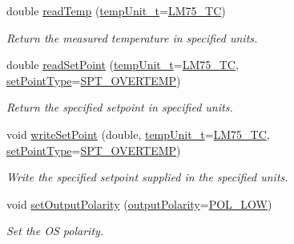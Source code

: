 \begin{DoxyCompactItemize}
\item 
double \hyperlink{class_l_m75_ae400ef90dd61fe676d10665a53e1e251}{read\-Temp} (\hyperlink{class_l_m75_a2a7ea6f324fe6d70e90dd76bac1d2f2d}{temp\-Unit\-\_\-t}=\hyperlink{class_l_m75_a2a7ea6f324fe6d70e90dd76bac1d2f2dac93d25e3d1bca073b3fb6c725de49ea1}{L\-M75\-\_\-\-T\-C})
\begin{DoxyCompactList}\small\item\em Return the measured temperature in specified units. \end{DoxyCompactList}\item 
double \hyperlink{class_l_m75_a64592e43e41d99ad216e3e25498d2603}{read\-Set\-Point} (\hyperlink{class_l_m75_a2a7ea6f324fe6d70e90dd76bac1d2f2d}{temp\-Unit\-\_\-t}=\hyperlink{class_l_m75_a2a7ea6f324fe6d70e90dd76bac1d2f2dac93d25e3d1bca073b3fb6c725de49ea1}{L\-M75\-\_\-\-T\-C}, \hyperlink{class_l_m75_ac49994df7bcf8aeda551af5b80559402}{set\-Point\-Type}=\hyperlink{class_l_m75_ac49994df7bcf8aeda551af5b80559402a230e9a69afffee2738e3364daff2c838}{S\-P\-T\-\_\-\-O\-V\-E\-R\-T\-E\-M\-P})
\begin{DoxyCompactList}\small\item\em Return the specified setpoint in specified units. \end{DoxyCompactList}\item 
void \hyperlink{class_l_m75_a06a3ac4dcab0a65183d34f7deea4291e}{write\-Set\-Point} (double, \hyperlink{class_l_m75_a2a7ea6f324fe6d70e90dd76bac1d2f2d}{temp\-Unit\-\_\-t}=\hyperlink{class_l_m75_a2a7ea6f324fe6d70e90dd76bac1d2f2dac93d25e3d1bca073b3fb6c725de49ea1}{L\-M75\-\_\-\-T\-C}, \hyperlink{class_l_m75_ac49994df7bcf8aeda551af5b80559402}{set\-Point\-Type}=\hyperlink{class_l_m75_ac49994df7bcf8aeda551af5b80559402a230e9a69afffee2738e3364daff2c838}{S\-P\-T\-\_\-\-O\-V\-E\-R\-T\-E\-M\-P})
\begin{DoxyCompactList}\small\item\em Write the specified setpoint supplied in the specified units. \end{DoxyCompactList}\item 
void \hyperlink{class_l_m75_a1aaf5ed1081a108e996228bcdc00a2d6}{set\-Output\-Polarity} (\hyperlink{class_l_m75_a199325ea8f9a90a2150587371682fc44}{output\-Polarity}=\hyperlink{class_l_m75_a199325ea8f9a90a2150587371682fc44a6ab923b2ccbda503412114744a377cdc}{P\-O\-L\-\_\-\-L\-O\-W})
\begin{DoxyCompactList}\small\item\em Set the O\-S polarity. \end{DoxyCompactList}\item 

\end{DoxyCompactItemize}
